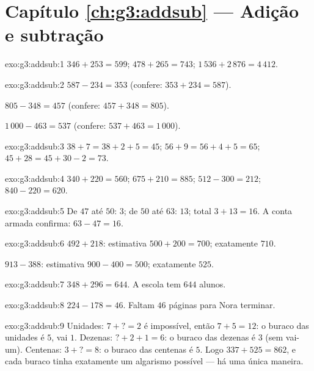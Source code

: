 \section*{Capítulo \ref{ch:g3:addsub} --- Adição e subtração}

\begin{solution}{exo:g3:addsub:1}
$346 + 253 = 599$; \quad
$478 + 265 = 743$; \quad
$1\,536 + 2\,876 = 4\,412$.
\end{solution}

\begin{solution}{exo:g3:addsub:2}
$587 - 234 = 353$ (confere: $353 + 234 = 587$).

$805 - 348 = 457$ (confere: $457 + 348 = 805$).

$1\,000 - 463 = 537$ (confere: $537 + 463 = 1\,000$).
\end{solution}

\begin{solution}{exo:g3:addsub:3}
$38 + 7 = 38 + 2 + 5 = 45$; \quad
$56 + 9 = 56 + 4 + 5 = 65$; \quad
$45 + 28 = 45 + 30 - 2 = 73$.
\end{solution}

\begin{solution}{exo:g3:addsub:4}
$340 + 220 = 560$; \quad $675 + 210 = 885$; \quad
$512 - 300 = 212$; \quad $840 - 220 = 620$.
\end{solution}

\begin{solution}{exo:g3:addsub:5}
De $47$ até $50$: $3$; de $50$ até $63$: $13$; total
$3 + 13 = 16$. A conta armada confirma: $63 - 47 = 16$.
\end{solution}

\begin{solution}{exo:g3:addsub:6}
$492 + 218$: estimativa $500 + 200 = 700$; exatamente $710$.

$913 - 388$: estimativa $900 - 400 = 500$; exatamente $525$.
\end{solution}

\begin{solution}{exo:g3:addsub:7}
$348 + 296 = 644$. A escola tem $644$ alunos.
\end{solution}

\begin{solution}{exo:g3:addsub:8}
$224 - 178 = 46$. Faltam $46$ páginas para Nora terminar.
\end{solution}

\begin{solution}{exo:g3:addsub:9}
Unidades: $7 + \text{?} = 2$ é impossível, então $7 + 5 = 12$: o
buraco das unidades é $5$, vai $1$. Dezenas:
$\text{?} + 2 + 1 = 6$: o buraco das dezenas é $3$ (sem vai-um).
Centenas: $3 + \text{?} = 8$: o buraco das centenas é $5$. Logo
$337 + 525 = 862$, e cada buraco tinha exatamente um algarismo
possível --- há uma única maneira.
\end{solution}

